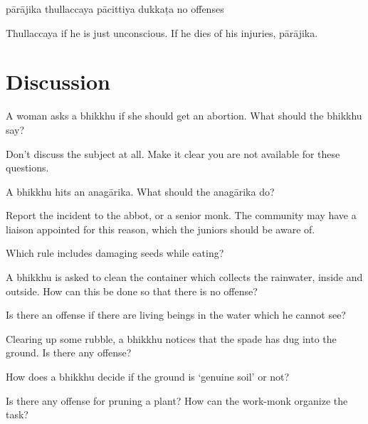 \begin{exam}{\autoExamName}
\begin{problem*}
\begin{parts}
  \bigskip

  \begin{answers}{5}
    \bChoices
     pārājika\eAns
     thullaccaya\eAns
     pācittiya\eAns
     dukkaṭa\eAns
     no offenses\eAns
    \eChoices
  \end{answers}

  \begin{solution}
    Thullaccaya if he is just unconscious. If he dies of his injuries, pārājika.
  \end{solution}

\end{parts}

\end{problem*}

\end{exam}

\section*{Discussion}

A woman asks a bhikkhu if she should get an abortion. What should the bhikkhu say?

\begin{solution}
  Don't discuss the subject at all. Make it clear you are not available for these questions.
\end{solution}

\bigskip

A bhikkhu hits an anagārika. What should the anagārika do?

\begin{solution}
  Report the incident to the abbot, or a senior monk.
  The community may have a liaison appointed for this reason,
  which the juniors should be aware of.
\end{solution}

\bigskip

Which rule includes damaging seeds while eating?

\bigskip

A bhikkhu is asked to clean the container which collects the rainwater, inside and outside.
How can this be done so that there is no offense?

\bigskip

Is there an offense if there are living beings in the water which he cannot see?

\bigskip

Clearing up some rubble, a bhikkhu notices that the spade has dug into the ground. Is there any offense?

\bigskip

How does a bhikkhu decide if the ground is `genuine soil' or not?

\bigskip

Is there any offense for pruning a plant? How can the work-monk organize the task?
